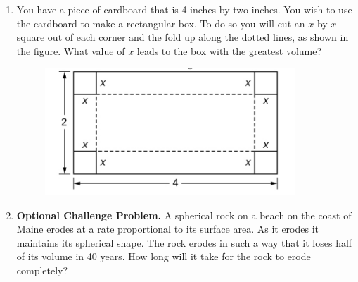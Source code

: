 \documentclass[12pt]{extarticle}
\begin{document}
\begin{enumerate}
\setlength{\itemsep}{3mm}

\item You have a piece of cardboard that is 4 inches by two
  inches. You wish to use the cardboard to make a rectangular box. To
  do so you will cut an $x$ by $x$ square out of each corner and the
  fold up along the dotted lines, as shown in the figure. What value
  of $x$ leads to the box with the greatest volume?

\begin{figure}[h!]
\begin{center}
\vspace{1mm}
\includegraphics[width=3.7in]{box.png}
\vspace{-2mm}
\label{fig:towns}
\vspace{-1mm}
\end{center}
\end{figure}

\item {\bf Optional Challenge Problem.} A spherical rock on a beach on
  the coast of Maine erodes at a rate proportional to its surface
  area. As it erodes it maintains its spherical shape. The rock erodes
  in such a way that it loses half of its volume in 40 years.  How
  long will it take for the rock to erode completely?
\end{enumerate}
\end{document}
